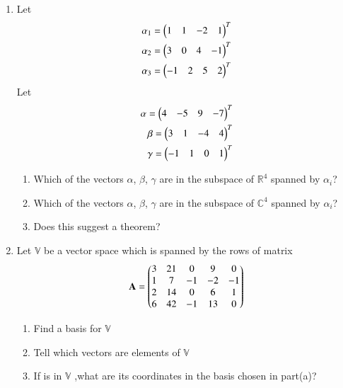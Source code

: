\renewcommand{\theequation}{\theenumi}
\renewcommand{\thefigure}{\theenumi}
\begin{enumerate}[label=\thesubsection.\arabic*.,ref=\thesubsection.\theenumi]

%
\item Let
\begin{align} 
\alpha_1=\begin{pmatrix}1&1&-2&1\end{pmatrix}^T \\
\alpha_2=\begin{pmatrix}3&0&4&-1\end{pmatrix}^T \\
\alpha_3=\begin{pmatrix}-1&2&5&2\end{pmatrix}^T
\end{align}
Let
\begin{align}
\alpha=\begin{pmatrix}4&-5&9&-7\end{pmatrix}^T \\
\beta=\begin{pmatrix}3&1&-4&4\end{pmatrix}^T \\
\gamma=\begin{pmatrix}-1&1&0&1\end{pmatrix}^T
\end{align}
\begin{enumerate}
\item Which of the vectors $\alpha$, $\beta$, $\gamma$ are in the subspace of $\mathbb{R}^4$ spanned by $\alpha_i$?
\item Which of the vectors $\alpha$, $\beta$, $\gamma$ are in the subspace of $\mathbb{C}^4$ spanned by $\alpha_i$?
\item Does this suggest a theorem?
\end{enumerate}
%
%
\solution

%
\item Let $\mathbb{V}$ be a vector space which is spanned by the rows of matrix
\begin{align}
    \mathbf{A} = \begin{pmatrix}3&21&0&9&0\\1&7&-1&-2&-1\\2&14&0&6&1\\6&42&-1&13&0\end{pmatrix}\label{eq:solutions/2/5/6/eq:mat}
\end{align}
\begin{enumerate}[label=\alph*.]
\item Find a basis for $\mathbb{V}$
\item Tell which vectors  are elements of $\mathbb{V}$ 
\item If  is in $\mathbb{V}$ ,what are its coordinates in the basis chosen in part(a)?
\end{enumerate}
%
\solution


\end{enumerate}
